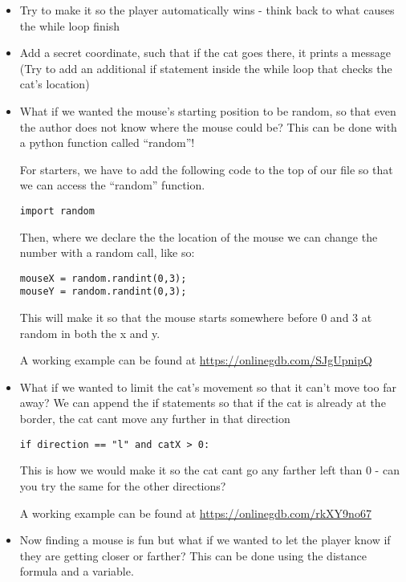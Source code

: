 \documentclass[12pt,oneside]{article}
\newcommand{\q}[1]{``#1''}
\begin{document}
\begin{itemize}

\item Try to make it so the player automatically wins - think back to what causes the while loop finish
\item Add a secret coordinate, such that if the cat goes there, it prints a message (Try to add an additional if statement inside the while loop that checks the cat's location)
\item What if we wanted the mouse's starting position to be random, so that even the author does not know where the mouse could be? This can be done with a python function called \q{random}!

For starters, we have to add the following code to the top of our file so that we can access the \q{random} function.

\begin{lstlisting}
import random
\end{lstlisting}

Then, where we declare the the location of the mouse we can change the number with a random call, like so:


\begin{lstlisting}
mouseX = random.randint(0,3);
mouseY = random.randint(0,3);
\end{lstlisting}

This will make it so that the mouse starts somewhere before 0 and 3 at random in both the x and y. 

A working example can be found at \url{https://onlinegdb.com/SJgUpnipQ}

\item What if we wanted to limit the cat's movement so that it can't move too far away? We can append the if statements so that if the cat is already at the border, the cat cant move any further in that direction

\begin{lstlisting}
if direction == "l" and catX > 0:
\end{lstlisting}

This is how we would make it so the cat cant go any farther left than 0 - can you try the same for the other directions?

A working example can be found at \url{https://onlinegdb.com/rkXY9no67}

\item Now finding a mouse is fun but what if we wanted to let the player know if they are getting closer or farther? This can be done using the distance formula and a variable. 


\end{itemize}
\end{document}
